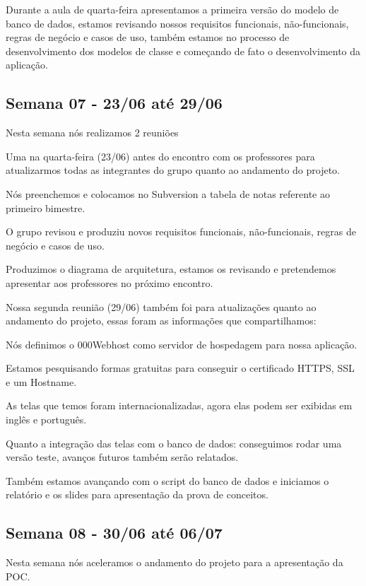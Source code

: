\begin{apendicesenv}
\begin{flushleft}
Durante a aula de quarta-feira apresentamos a primeira versão do modelo de banco de dados, estamos revisando nossos requisitos funcionais, não-funcionais, regras de negócio e casos de uso, também estamos no processo de desenvolvimento dos modelos de classe e começando de fato o desenvolvimento da aplicação.
\end{flushleft}
\begin{flushleft}
 \section{Semana 07 - 23/06 até 29/06}
 Nesta semana nós realizamos 2 reuniões

Uma na quarta-feira (23/06) antes do encontro com os professores para atualizarmos todas as integrantes do grupo quanto ao andamento do projeto.

Nós preenchemos e colocamos no \gls{Subversion} a tabela de notas referente ao primeiro bimestre.

O grupo revisou e produziu novos requisitos funcionais, não-funcionais, regras de negócio e casos de uso.

Produzimos o diagrama de arquitetura, estamos os revisando e pretendemos apresentar aos professores no próximo encontro.

Nossa segunda reunião (29/06) também foi para atualizações quanto ao andamento do projeto, essas foram as informações que compartilhamos:

Nós definimos o \gls{000Webhost} como servidor de hospedagem para nossa aplicação.

Estamos pesquisando formas gratuitas para conseguir o certificado \ac{HTTPS}, \ac{SSL} e um \gls{Hostname}.

As telas que temos foram internacionalizadas, agora elas podem ser exibidas em inglês e português. 

Quanto a integração das telas com o banco de dados: conseguimos rodar uma versão teste, avanços futuros também serão relatados.

Também estamos avançando com o script do banco de dados e iniciamos o relatório e os slides para apresentação da prova de conceitos.
\end{flushleft}
\begin{flushleft}
 \section{Semana 08 - 30/06 até 06/07}
  Nesta semana nós aceleramos o andamento do projeto para a apresentação da \ac{POC}.


\end{flushleft}
\end{apendicesenv}
